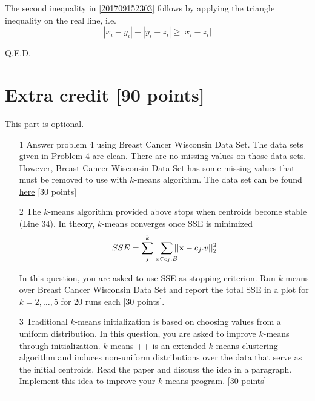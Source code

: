\documentclass[a4paper,11pt]{article}
\newcommand{\sep}{\begin{center}\textcolor{gray}{\rule{\textwidth}{0.75pt}}\end{center}}
\begin{document}
\begin{enumerate}
    The second inequality in \eqref{201709152303} follows by applying the triangle inequality on the real line, i.e.
    \[
        |x_i-y_i|+|y_i-z_i|\ge |x_i-z_i|
    \]
    
\end{enumerate}
\hfill Q.E.D.

















\newpage
\section*{Extra credit [90 points]}

This part is optional. 

\begin{enumerate}
\item[1]  Answer problem 4 using Breast Cancer Wisconsin Data Set. The data sets given in Problem 4 are clean. There are no missing values on those data sets. However, Breast Cancer Wisconsin Data Set has some missing values that must be removed to use with $k$-means algorithm. The data set can be found  \href{https://archive.ics.uci.edu/ml/datasets/breast+cancer+wisconsin+(original}{here} [30 points]

\item[2] The $k$-means algorithm provided above stops when centroids become stable (Line  34). In theory, $k$-means converges once SSE is minimized
\begin{eqnarray*}
SSE = \sum_{j}^k \ \ \smashoperator{ \sum_{x \in c_j.B}} ||\mathbf{x} - c_j.v||^2_2 \label{costfunt}
\end{eqnarray*} 
 
In this question, you are asked to use SSE as stopping criterion. Run $k$-means over Breast Cancer Wisconsin Data Set  and report the total SSE  in a plot for $k = 2,\ldots ,5$ for 20 runs each [30 points].

\item[3] Traditional $k$-means initialization is based on choosing values from a uniform distribution. In this question, you are asked to improve $k$-means through initialization.  \href{http://ilpubs.stanford.edu:8090/778/1/2006-13.pdf}{$k$-means ++} is an extended $k$-means clustering algorithm and induces non-uniform  distributions over  the data  that serve as  the initial centroids. Read the paper and discuss the idea in a paragraph.  Implement this idea to improve your $k$-means program. [30 points]
\end{enumerate}
\sep 
\end{document}
